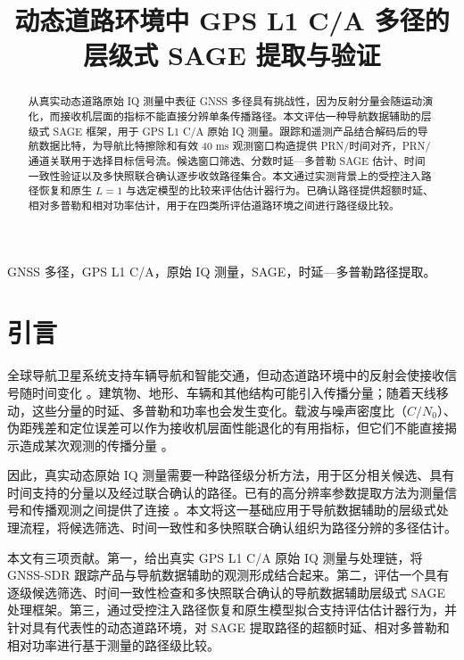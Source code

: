 \documentclass[conference]{IEEEtran}
\title{动态道路环境中 GPS L1 C/A 多径的层级式 SAGE 提取与验证}
\author{\IEEEauthorblockN{作者信息待确认}
\IEEEauthorblockA{单位、通信地址和电子邮箱待确认\\[-1pt]
\textit{VTC2027-Spring 中文审阅版（非投稿版本）}}}
\begin{document}
\maketitle

\begin{abstract}
从真实动态道路原始 IQ 测量中表征 GNSS 多径具有挑战性，因为反射分量会随运动演化，而接收机层面的指标不能直接分辨单条传播路径。本文评估一种导航数据辅助的层级式 SAGE 框架，用于 GPS L1 C/A 原始 IQ 测量。跟踪和遥测产品结合解码后的导航数据比特，为导航比特擦除和有效 40 ms 观测窗口构造提供 PRN/时间对齐，PRN/通道关联用于选择目标信号流。候选窗口筛选、分数时延—多普勒 SAGE 估计、时间一致性验证以及多快照联合确认逐步收敛路径集合。本文通过实测背景上的受控注入路径恢复和原生 $L=1$ 与选定模型的比较来评估估计器行为。已确认路径提供超额时延、相对多普勒和相对功率估计，用于在四类所评估道路环境之间进行路径级比较。
\end{abstract}

\begin{IEEEkeywords}
GNSS 多径，GPS L1 C/A，原始 IQ 测量，SAGE，时延—多普勒路径提取。
\end{IEEEkeywords}

\section{引言}
全球导航卫星系统支持车辆导航和智能交通，但动态道路环境中的反射会使接收信号随时间变化 \cite{eissfeller1996gpsdynamic,mora1998multipath,beitler2015cmcd}。建筑物、地形、车辆和其他结构可能引入传播分量；随着天线移动，这些分量的时延、多普勒和功率也会发生变化。载波与噪声密度比（$C/N_0$）、伪距残差和定位误差可以作为接收机层面性能退化的有用指标，但它们不能直接揭示造成某次观测的传播分量 \cite{bilich2007snr,xie2011vehicular,beitler2015cmcd}。

因此，真实动态原始 IQ 测量需要一种路径级分析方法，用于区分相关候选、具有时间支持的分量以及经过联合确认的路径。已有的高分辨率参数提取方法为测量信号和传播观测之间提供了连接 \cite{fleury1999sage}。本文将这一基础应用于导航数据辅助的层级式处理流程，将候选筛选、时间一致性和多快照联合确认组织为路径分辨的多径估计。

本文有三项贡献。第一，给出真实 GPS L1 C/A 原始 IQ 测量与处理链，将 GNSS-SDR 跟踪产品与导航数据辅助的观测形成结合起来。第二，评估一个具有逐级候选筛选、时间一致性检查和多快照联合确认的导航数据辅助层级式 SAGE 处理框架。第三，通过受控注入路径恢复和原生模型拟合支持评估估计器行为，并针对具有代表性的动态道路环境，对 SAGE 提取路径的超额时延、相对多普勒和相对功率进行基于测量的路径级比较。
\end{document}
